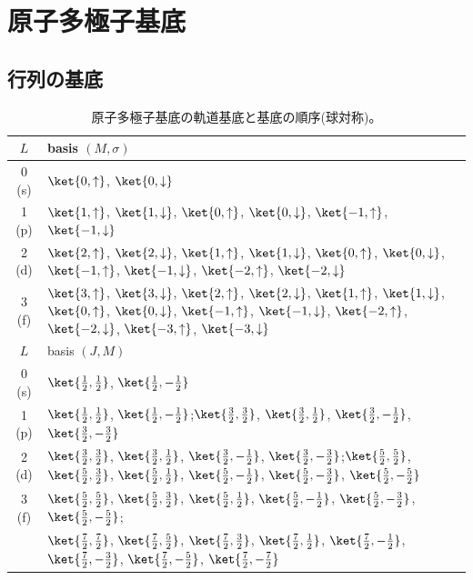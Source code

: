 \documentclass[11pt]{easymemo}
\begin{document}
\section{原子多極子基底}

\subsection{行列の基底}

\begin{table}[t!]
\begin{center}
\small
\caption{原子多極子基底の軌道基底と基底の順序(球対称)。}
\label{tbl:orbbasis}
\begin{tabular}{cl} \hline\hline
$L$ & basis $(M,\sigma)$ \\ \hline
0 (s) & $\ket{0,\uparrow}$, $\ket{0,\downarrow}$ \\
1 (p) & $\ket{1,\uparrow}$, $\ket{1,\downarrow}$, $\ket{0,\uparrow}$, $\ket{0,\downarrow}$, $\ket{-1,\uparrow}$, $\ket{-1,\downarrow}$ \\
2 (d) & $\ket{2,\uparrow}$, $\ket{2,\downarrow}$, $\ket{1,\uparrow}$, $\ket{1,\downarrow}$, $\ket{0,\uparrow}$, $\ket{0,\downarrow}$, $\ket{-1,\uparrow}$, $\ket{-1,\downarrow}$, $\ket{-2,\uparrow}$, $\ket{-2,\downarrow}$ \\
3 (f) & $\ket{3,\uparrow}$, $\ket{3,\downarrow}$, $\ket{2,\uparrow}$, $\ket{2,\downarrow}$, $\ket{1,\uparrow}$, $\ket{1,\downarrow}$, $\ket{0,\uparrow}$, $\ket{0,\downarrow}$, $\ket{-1,\uparrow}$, $\ket{-1,\downarrow}$, $\ket{-2,\uparrow}$, $\ket{-2,\downarrow}$, $\ket{-3,\uparrow}$, $\ket{-3,\downarrow}$ \\ \hline
$L$ & basis $(J,M)$ \\ \hline
0 (s) & $\ket{\frac{1}{2},\frac{1}{2}}$, $\ket{\frac{1}{2},-\frac{1}{2}}$ \\
1 (p) & $\ket{\frac{1}{2},\frac{1}{2}}$, $\ket{\frac{1}{2},-\frac{1}{2}}$;\quad $\ket{\frac{3}{2},\frac{3}{2}}$, $\ket{\frac{3}{2},\frac{1}{2}}$, $\ket{\frac{3}{2},-\frac{1}{2}}$, $\ket{\frac{3}{2},-\frac{3}{2}}$ \\
2 (d) & $\ket{\frac{3}{2},\frac{3}{2}}$, $\ket{\frac{3}{2},\frac{1}{2}}$, $\ket{\frac{3}{2},-\frac{1}{2}}$, $\ket{\frac{3}{2},-\frac{3}{2}}$;\quad $\ket{\frac{5}{2},\frac{5}{2}}$, $\ket{\frac{5}{2},\frac{3}{2}}$, $\ket{\frac{5}{2},\frac{1}{2}}$, $\ket{\frac{5}{2},-\frac{1}{2}}$, $\ket{\frac{5}{2},-\frac{3}{2}}$, $\ket{\frac{5}{2},-\frac{5}{2}}$ \\
3 (f) & $\ket{\frac{5}{2},\frac{5}{2}}$, $\ket{\frac{5}{2},\frac{3}{2}}$, $\ket{\frac{5}{2},\frac{1}{2}}$, $\ket{\frac{5}{2},-\frac{1}{2}}$, $\ket{\frac{5}{2},-\frac{3}{2}}$, $\ket{\frac{5}{2},-\frac{5}{2}}$; \\
& $\ket{\frac{7}{2},\frac{7}{2}}$, $\ket{\frac{7}{2},\frac{5}{2}}$, $\ket{\frac{7}{2},\frac{3}{2}}$, $\ket{\frac{7}{2},\frac{1}{2}}$, $\ket{\frac{7}{2},-\frac{1}{2}}$, $\ket{\frac{7}{2},-\frac{3}{2}}$, $\ket{\frac{7}{2},-\frac{5}{2}}$, $\ket{\frac{7}{2},-\frac{7}{2}}$ \\
\hline\hline
\end{tabular}
\end{center}
\end{table}
\end{document}
